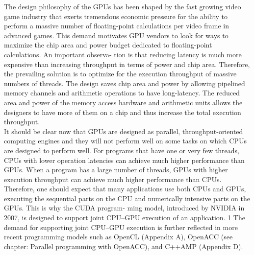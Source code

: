 \documentclass[11pt]{ctexart}
\begin{document}
The design philosophy of the GPUs has been shaped by the fast growing video
game industry that exerts tremendous economic pressure for the ability to perform a
massive number of floating-point calculations per video frame in advanced games.
This demand motivates GPU vendors to look for ways to maximize the chip area
and power budget dedicated to floating-point calculations. An important observa-
tion is that reducing latency is much more expensive than increasing throughput
in terms of power and chip area. Therefore, the prevailing solution is to optimize
for the execution throughput of massive numbers of threads. The design saves chip
area and power by allowing pipelined memory channels and arithmetic operations
to have long-latency. The reduced area and power of the memory access hardware
and arithmetic units allows the designers to have more of them on a chip and thus
increase the total execution throughput.\\

It should be clear now that GPUs are designed as parallel, throughput-oriented
computing engines and they will not perform well on some tasks on which CPUs are
designed to perform well. For programs that have one or very few threads, CPUs with
lower operation latencies can achieve much higher performance than GPUs. When
a program has a large number of threads, GPUs with higher execution throughput
can achieve much higher performance than CPUs. Therefore, one should expect that
many applications use both CPUs and GPUs, executing the sequential parts on the CPU and numerically intensive parts on the GPUs. This is why the CUDA program-
ming model, introduced by NVIDIA in 2007, is designed to support joint CPU–GPU
execution of an application. 1 The demand for supporting joint CPU–GPU execution is
further reflected in more recent programming models such as OpenCL (Appendix A),
OpenACC (see chapter: Parallel programming with OpenACC), and C++AMP
(Appendix D).\\
\end{document}

